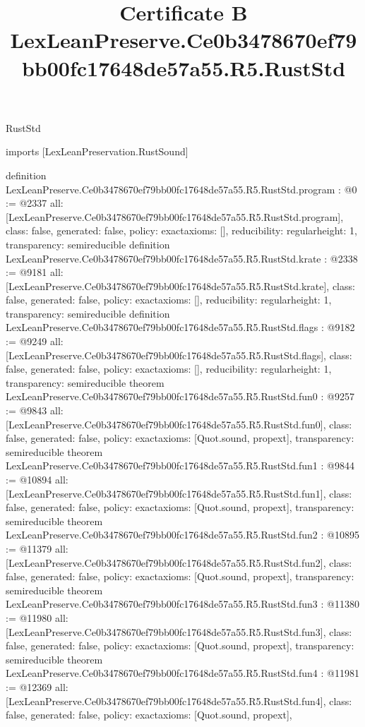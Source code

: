 \begin{lexlean}{RustStd}
\title{Certificate B LexLeanPreserve.Ce0b3478670ef79bb00fc17648de57a55.R5.RustStd}
\begin{coremodule}
imports [LexLeanPreservation.RustSound]

definition LexLeanPreserve.Ce0b3478670ef79bb00fc17648de57a55.R5.RustStd.program : @0 := @2337 {
  all: [LexLeanPreserve.Ce0b3478670ef79bb00fc17648de57a55.R5.RustStd.program],
  class: false,
  generated: false,
  policy: exact{axioms: []},
  reducibility: regular{height: 1},
  transparency: semireducible
}
definition LexLeanPreserve.Ce0b3478670ef79bb00fc17648de57a55.R5.RustStd.krate : @2338 := @9181 {
  all: [LexLeanPreserve.Ce0b3478670ef79bb00fc17648de57a55.R5.RustStd.krate],
  class: false,
  generated: false,
  policy: exact{axioms: []},
  reducibility: regular{height: 1},
  transparency: semireducible
}
definition LexLeanPreserve.Ce0b3478670ef79bb00fc17648de57a55.R5.RustStd.flags : @9182 := @9249 {
  all: [LexLeanPreserve.Ce0b3478670ef79bb00fc17648de57a55.R5.RustStd.flags],
  class: false,
  generated: false,
  policy: exact{axioms: []},
  reducibility: regular{height: 1},
  transparency: semireducible
}
theorem LexLeanPreserve.Ce0b3478670ef79bb00fc17648de57a55.R5.RustStd.fun0 : @9257 := @9843 {
  all: [LexLeanPreserve.Ce0b3478670ef79bb00fc17648de57a55.R5.RustStd.fun0],
  class: false,
  generated: false,
  policy: exact{axioms: [Quot.sound, propext]},
  transparency: semireducible
}
theorem LexLeanPreserve.Ce0b3478670ef79bb00fc17648de57a55.R5.RustStd.fun1 : @9844 := @10894 {
  all: [LexLeanPreserve.Ce0b3478670ef79bb00fc17648de57a55.R5.RustStd.fun1],
  class: false,
  generated: false,
  policy: exact{axioms: [Quot.sound, propext]},
  transparency: semireducible
}
theorem LexLeanPreserve.Ce0b3478670ef79bb00fc17648de57a55.R5.RustStd.fun2 : @10895 := @11379 {
  all: [LexLeanPreserve.Ce0b3478670ef79bb00fc17648de57a55.R5.RustStd.fun2],
  class: false,
  generated: false,
  policy: exact{axioms: [Quot.sound, propext]},
  transparency: semireducible
}
theorem LexLeanPreserve.Ce0b3478670ef79bb00fc17648de57a55.R5.RustStd.fun3 : @11380 := @11980 {
  all: [LexLeanPreserve.Ce0b3478670ef79bb00fc17648de57a55.R5.RustStd.fun3],
  class: false,
  generated: false,
  policy: exact{axioms: [Quot.sound, propext]},
  transparency: semireducible
}
theorem LexLeanPreserve.Ce0b3478670ef79bb00fc17648de57a55.R5.RustStd.fun4 : @11981 := @12369 {
  all: [LexLeanPreserve.Ce0b3478670ef79bb00fc17648de57a55.R5.RustStd.fun4],
  class: false,
  generated: false,
  policy: exact{axioms: [Quot.sound, propext]},
}
\end{coremodule}
\end{lexlean}

